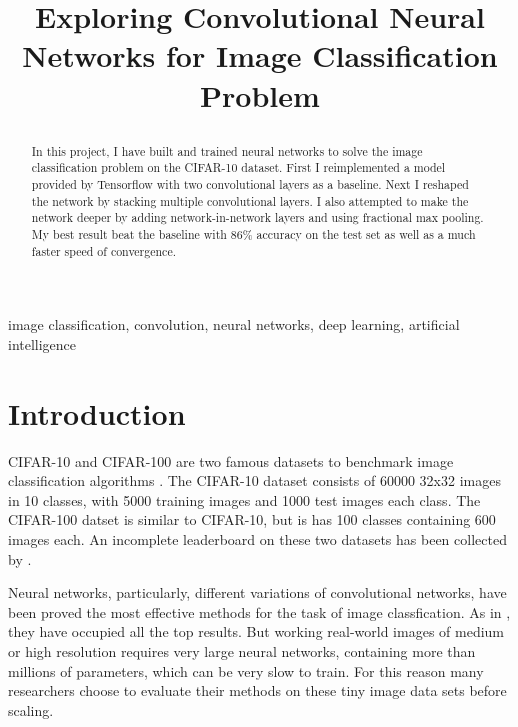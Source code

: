\documentclass[conference]{IEEEtran}
\begin{document}
\title{Exploring Convolutional Neural Networks for Image Classification Problem \\
\author{
}
}

\maketitle

\begin{abstract}
In this project, I have built and trained neural networks to solve the image classification problem on the CIFAR-10 dataset. First I reimplemented a model provided by Tensorflow with two convolutional layers as a baseline. Next I reshaped the network by stacking multiple convolutional layers. I also attempted to make the network deeper by adding network-in-network layers and using fractional max pooling. My best result beat the baseline with 86\% accuracy on the test set as well as a much faster speed of convergence.\\   
\end{abstract}

\begin{IEEEkeywords}
image classification, convolution, neural networks, deep learning, artificial intelligence
\end{IEEEkeywords}

\section{Introduction}
CIFAR-10 and CIFAR-100 are two famous datasets to benchmark image classification algorithms \cite{cifar}. The CIFAR-10 dataset consists of 60000 32x32 images in 10 classes, with 5000 training images and 1000 test images each class. The CIFAR-100 datset is similar to CIFAR-10, but is has 100 classes containing 600 images each. An incomplete leaderboard on these two datasets has been collected by \cite{leaderboard}.

Neural networks, particularly, different variations of convolutional networks, have been proved the most effective methods for the task of image classfication. As in \cite{leaderboard}, they have occupied all the top results. But working real-world images of medium or high resolution requires very large neural networks, containing more than millions of parameters, which can be very slow to train\cite{conv}. For this reason many researchers choose to evaluate their methods on these tiny image data sets before scaling. 
\end{document}
